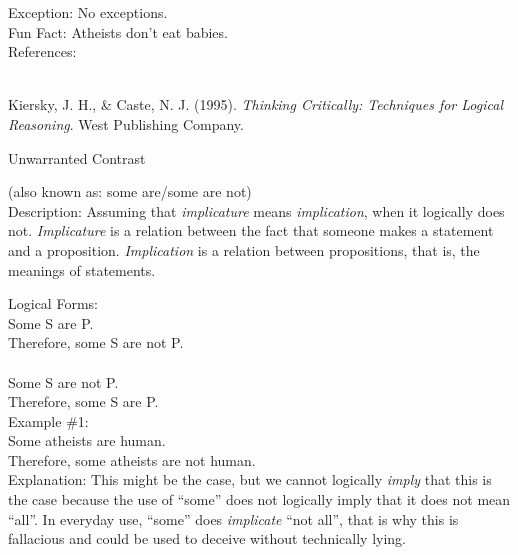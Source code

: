 \documentclass[a4paper,12pt,single,pdftex]{scrartcl}
\begin{document}
    
      Exception: No exceptions.
    \\

    
      Fun Fact: Atheists don’t eat babies.
    \\

    References:

    
      
        
      \\

      
        
          Kiersky, J. H., \& Caste, N. J. (1995). {\it Thinking Critically: Techniques for Logical Reasoning}. West Publishing Company.
        
      
    
  

Unwarranted Contrast
    
      (also known as: some are/some are not)
    \\

  
    Description: Assuming that {\it implicature} means {\it implication}, when it logically does not.  {\it Implicature} is a relation between the fact that someone makes a statement and a proposition.  {\it Implication}  is a relation between propositions, that is, the meanings of statements.

    
      Logical Forms:
    \\

    
      Some S are P.
    \\

    
      Therefore, some S are not P.      
    \\

    
       
    \\

    
      Some S are not P.
    \\

    
      Therefore, some S are P.
    \\

    
      Example \#1:
    \\

    
      Some atheists are human.
    \\

    
      Therefore, some atheists are not human.
    \\

    
      Explanation: This might be the case, but we cannot logically {\it imply}  that this is the case because the use of “some” does not logically imply that it does not mean “all”.  In everyday use, “some” does {\it implicate}  “not all”, that is why this is fallacious and could be used to deceive without technically lying.
    \\
\end{document}
